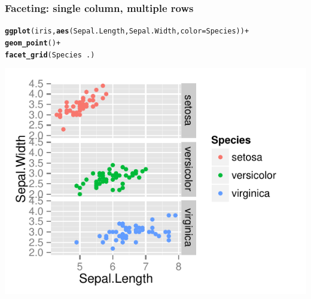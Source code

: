 \documentclass{beamer}\usepackage[]{graphicx}\usepackage[]{color}
\makeatletter
\newcommand{\hlopt}[1]{\textcolor[rgb]{0,0,0}{#1}}%
\newcommand{\hlstd}[1]{\textcolor[rgb]{0.345,0.345,0.345}{#1}}%
\newcommand{\hlkwc}[1]{\textcolor[rgb]{0.333,0.667,0.333}{#1}}%
\newcommand{\hlkwd}[1]{\textcolor[rgb]{0.737,0.353,0.396}{\textbf{#1}}}%
\newenvironment{kframe}{%
 \def\at@end@of@kframe{}%
 \ifinner\ifhmode%
  \def\at@end@of@kframe{\end{minipage}}%
  \begin{minipage}{\columnwidth}%
 \fi\fi%
 \def\FrameCommand##1{\hskip\@totalleftmargin \hskip-\fboxsep
 \colorbox{shadecolor}{##1}\hskip-\fboxsep
     \hskip-\linewidth \hskip-\@totalleftmargin \hskip\columnwidth}%
 \MakeFramed {\advance\hsize-\width
   \@totalleftmargin\z@ \linewidth\hsize
   \@setminipage}}%
 {\par\unskip\endMakeFramed%
 \at@end@of@kframe}
\newenvironment{knitrout}{}{} %
\makeatother
\begin{document}

\begin{frame}[fragile]
\frametitle{Faceting: single column, multiple rows}
\begin{knitrout}\footnotesize
{}\color{fgcolor}\begin{kframe}
\begin{alltt}
\hlkwd{ggplot}\hlstd{(iris,} \hlkwd{aes}\hlstd{(Sepal.Length, Sepal.Width,} \hlkwc{color} \hlstd{= Species))} \hlopt{+}
    \hlkwd{geom_point}\hlstd{()} \hlopt{+}
    \hlkwd{facet_grid}\hlstd{(Species} \hlopt{~} \hlstd{.)}
\end{alltt}
\end{kframe}

{\centering \includegraphics[width=.75\linewidth]{figure/facetgrid1} 

}



\end{knitrout}
\end{frame}

\end{document}
